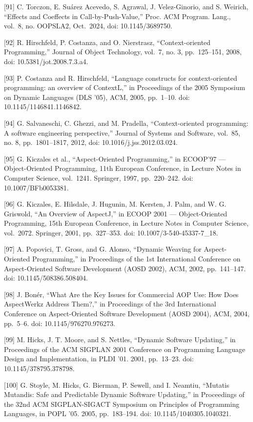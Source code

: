 \documentclass[
  10
]{article}
\begin{document}
{[}91{]} C. Torczon, E. Suárez Acevedo, S. Agrawal, J. Velez-Ginorio, and S. Weirich,
``Effects and Coeffects in Call-by-Push-Value,'' Proc. ACM Program. Lang., vol.~8,
no. OOPSLA2, Oct.~2024, doi: 10.1145/3689750.

{[}92{]} R. Hirschfeld, P. Costanza, and O. Nierstrasz, ``Context-oriented
Programming,'' Journal of Object Technology, vol.~7, no. 3, pp.~125--151, 2008, doi:
10.5381/jot.2008.7.3.a4.

{[}93{]} P. Costanza and R. Hirschfeld, ``Language constructs for context-oriented
programming: an overview of ContextL,'' in Proceedings of the 2005 Symposium on
Dynamic Languages (DLS '05), ACM, 2005, pp.~1--10. doi: 10.1145/1146841.1146842.

{[}94{]} G. Salvaneschi, C. Ghezzi, and M. Pradella, ``Context-oriented programming:
A software engineering perspective,'' Journal of Systems and Software, vol.~85,
no. 8, pp.~1801--1817, 2012, doi: 10.1016/j.jss.2012.03.024.

{[}95{]} G. Kiczales et al., ``Aspect-Oriented Programming,'' in ECOOP'97 ---
Object-Oriented Programming, 11th European Conference, in Lecture Notes in Computer
Science, vol.~1241. Springer, 1997, pp.~220--242. doi: 10.1007/BFb0053381.

{[}96{]} G. Kiczales, E. Hilsdale, J. Hugunin, M. Kersten, J. Palm, and W. G.
Griswold, ``An Overview of AspectJ,'' in ECOOP 2001 --- Object-Oriented
Programming, 15th European Conference, in Lecture Notes in Computer Science,
vol.~2072. Springer, 2001, pp.~327--353. doi: 10.1007/3-540-45337-7\_18.

{[}97{]} A. Popovici, T. Gross, and G. Alonso, ``Dynamic Weaving for Aspect-Oriented
Programming,'' in Proceedings of the 1st International Conference on Aspect-Oriented
Software Development (AOSD 2002), ACM, 2002, pp.~141--147. doi: 10.1145/508386.508404.

{[}98{]} J. Bonér, ``What Are the Key Issues for Commercial AOP Use: How Does
AspectWerkz Address Them?,'' in Proceedings of the 3rd International Conference on
Aspect-Oriented Software Development (AOSD 2004), ACM, 2004, pp.~5--6. doi:
10.1145/976270.976273.

{[}99{]} M. Hicks, J. T. Moore, and S. Nettles, ``Dynamic Software Updating,'' in
Proceedings of the ACM SIGPLAN 2001 Conference on Programming Language Design and
Implementation, in PLDI '01. 2001, pp.~13--23. doi: 10.1145/378795.378798.

{[}100{]} G. Stoyle, M. Hicks, G. Bierman, P. Sewell, and I. Neamtiu, ``Mutatis
Mutandis: Safe and Predictable Dynamic Software Updating,'' in Proceedings of the
32nd ACM SIGPLAN-SIGACT Symposium on Principles of Programming Languages, in POPL
'05. 2005, pp.~183--194. doi: 10.1145/1040305.1040321.
\end{document}
